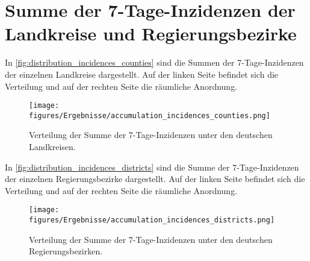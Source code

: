 \section{Summe der 7-Tage-Inzidenzen der Landkreise und Regierungsbezirke}
In \autoref{fig:distribution_incidences_counties} sind die Summen der 7-Tage-Inzidenzen der einzelnen Landkreise dargestellt. Auf der linken Seite befindet sich die Verteilung und auf der rechten Seite die räumliche Anordnung.

\begin{figure}[H]
    \centering
    \texttt{[image: figures/Ergebnisse/accumulation\_incidences\_counties.png]}
    \caption{Verteilung der Summe der 7-Tage-Inzidenzen unter den deutschen Landkreisen.}
    \label{fig:distribution_incidences_counties}
\end{figure}

In \autoref{fig:distribution_incidences_districts} sind die Summe der 7-Tage-Inzidenzen der einzelnen Regierungsbezirke dargestellt. Auf der linken Seite befindet sich die Verteilung und auf der rechten Seite die räumliche Anordnung.

\begin{figure}[H]
    \centering
    \texttt{[image: figures/Ergebnisse/accumulation\_incidences\_districts.png]}
    \caption{Verteilung der Summe der 7-Tage-Inzidenzen unter den deutschen Regierungsbezirken.}
    \label{fig:distribution_incidences_districts}
\end{figure}